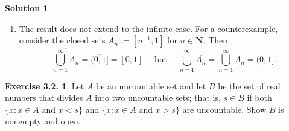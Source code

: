 \documentclass[12pt]{article}
\theoremstyle{definition}
\theoremstyle{exercise}
\newtheorem{exercise}{Exercise 3.2.}
\theoremstyle{solution}
\newtheorem*{solution}{Solution}
\newcommand{\N}{\mathbf{N}}
\begin{document}
\begin{solution}
\begin{enumerate}
        \item The result does not extend to the infinite case. For a counterexample, consider the closed sets \( A_n := [n^{-1}, 1] \) for \( n \in \N \). Then
        \[
            \overline{\bigcup_{n=1}^{\infty} A_n} = \overline{(0, 1]} = [0, 1] \quad \text{ but } \quad \bigcup_{n=1}^{\infty} \overline{A_n} = \bigcup_{n=1}^{\infty} A_n = (0, 1].
        \]
    \end{enumerate}
\end{solution}

\begin{exercise}
\label{ex:12}
    Let \( A \) be an uncountable set and let \( B \) be the set of real numbers that divides \( A \) into two uncountable sets; that is, \( s \in B \) if both \( \{ x : x \in A \text{ and } x < s \} \) and \( \{ x : x \in A \text{ and } x > s \} \) are uncountable. Show \( B \) is nonempty and open.
\end{exercise}
\end{document}
